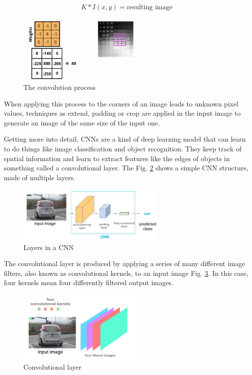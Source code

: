 \documentclass{article}
\begin{document}
\[K * I(x,y) = \text{resulting image}\]

\begin{figure}[ht]
    \centering
    \includegraphics[width=0.55\textwidth,height=0.55\textheight,keepaspectratio]{images/convolution.png}
    \captionsetup{justification=centering}
    \caption{The convolution process}
    \label{fig:f14}
\end{figure}

When applying this process to the corners of an image leads to unknown pixel values, techniques as extend, padding or crop are applied in the input image to generate an image of the same size of the input one. 

Getting more into detail, CNNs are a kind of deep learning model that can learn to do things like image classification and object recognition. They keep track of spatial information and learn to extract features like the edges of objects in something called a convolutional layer. The Fig. \ref{fig:f15} shows a simple CNN structure, made of multiple layers.

\begin{figure}[ht]
    \centering
    \includegraphics[width=0.65\textwidth,height=0.65\textheight,keepaspectratio]{images/layers_cnn.png}
    \captionsetup{justification=centering}
    \caption{Layers in a CNN}
    \label{fig:f15}
\end{figure}

The convolutional layer is produced by applying a series of many different image filters, also known as convolutional kernels, to an input image Fig. \ref{fig:f16}. In this case, four kernels mean four differently filtered output images.

\begin{figure}[ht]
    \centering
    \includegraphics[width=0.55\textwidth,height=0.55\textheight,keepaspectratio]{images/conv_layer.png}
    \captionsetup{justification=centering}
    \caption{Convolutional layer}
    \label{fig:f16}
\end{figure}
\end{document}
